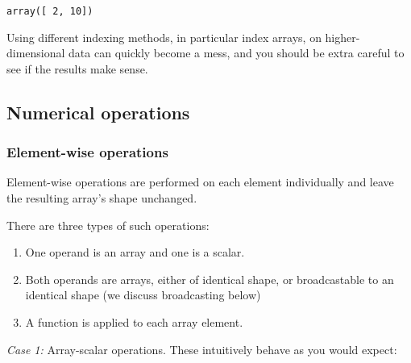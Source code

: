 \documentclass[10pt]{scrartcl}
\makeatletter
\providecommand{\tightlist}{%
      \setlength{\itemsep}{0pt}\setlength{\parskip}{0pt}}
\newcommand{\boxspacing}{\kern\kvtcb@left@rule\kern\kvtcb@boxsep}
\newcommand{\prompt}[4]{
        {\ttfamily\llap{{\color{#2}[#3]:\hspace{3pt}#4}}\vspace{-\baselineskip}}
    }
\makeatother
\begin{document}
            \begin{tcolorbox}[breakable, size=fbox, boxrule=.5pt, pad at break*=1mm, opacityfill=0]
\prompt{Out}{outcolor}{28}{\boxspacing}
\begin{Verbatim}[commandchars=\\\{\}]
array([ 2, 10])
\end{Verbatim}
\end{tcolorbox}
        
    Using different indexing methods, in particular index arrays, on
higher-dimensional data can quickly become a mess, and you should be
extra careful to see if the results make sense.


\hypertarget{numerical-operations}{%
\subsection{Numerical operations}\label{numerical-operations}}

\hypertarget{element-wise-operations}{%
\subsubsection{Element-wise operations}\label{element-wise-operations}}

Element-wise operations are performed on each element individually and
leave the resulting array's shape unchanged.

There are three types of such operations:

\begin{enumerate}
\def\labelenumi{\arabic{enumi}.}
\tightlist
\item
  One operand is an array and one is a scalar.
\item
  Both operands are arrays, either of identical shape, or broadcastable
  to an identical shape (we discuss broadcasting below)
\item
  A function is applied to each array element.
\end{enumerate}

\emph{Case 1:} Array-scalar operations. These intuitively behave as you
would expect:
\end{document}
